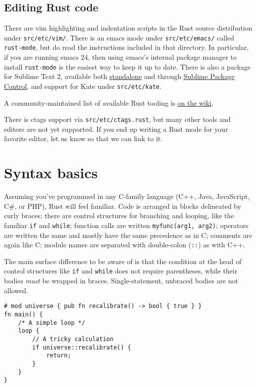\documentclass[]{article}
\begin{document}
\subsection{Editing Rust code}\label{editing-rust-code}

There are vim highlighting and indentation scripts in the Rust source
distribution under \texttt{src/etc/vim/}. There is an emacs mode under
\texttt{src/etc/emacs/} called \texttt{rust-mode}, but do read the
instructions included in that directory. In particular, if you are
running emacs 24, then using emacs's internal package manager to install
\texttt{rust-mode} is the easiest way to keep it up to date. There is
also a package for Sublime Text 2, available both
\href{http://github.com/jhasse/sublime-rust}{standalone} and through
\href{http://wbond.net/sublime_packages/package_control}{Sublime Package
Control}, and support for Kate under \texttt{src/etc/kate}.

A community-maintained list of available Rust tooling is
\href{https://github.com/rust-lang/rust/wiki/Doc-packages,-editors,-and-other-tools}{on
the wiki}.

There is ctags support via \texttt{src/etc/ctags.rust}, but many other
tools and editors are not yet supported. If you end up writing a Rust
mode for your favorite editor, let us know so that we can link to it.

\section{Syntax basics}\label{syntax-basics}

Assuming you've programmed in any C-family language (C++, Java,
JavaScript, C\#, or PHP), Rust will feel familiar. Code is arranged in
blocks delineated by curly braces; there are control structures for
branching and looping, like the familiar \texttt{if} and \texttt{while};
function calls are written \texttt{myfunc(arg1, arg2)}; operators are
written the same and mostly have the same precedence as in C; comments
are again like C; module names are separated with double-colon
(\texttt{::}) as with C++.

The main surface difference to be aware of is that the condition at the
head of control structures like \texttt{if} and \texttt{while} does not
require parentheses, while their bodies \emph{must} be wrapped in
braces. Single-statement, unbraced bodies are not allowed.

\begin{verbatim}
# mod universe { pub fn recalibrate() -> bool { true } }
fn main() {
    /* A simple loop */
    loop {
        // A tricky calculation
        if universe::recalibrate() {
            return;
        }
    }
}
\end{verbatim}
\end{document}
